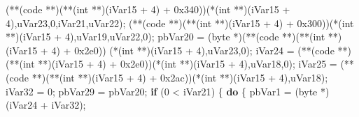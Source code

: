 \documentclass[
]{article}
\newenvironment{Shaded}{}{}
\newcommand{\BaseNTok}[1]{\textcolor[rgb]{0.25,0.63,0.44}{#1}}
\newcommand{\ControlFlowTok}[1]{\textcolor[rgb]{0.00,0.44,0.13}{\textbf{#1}}}
\newcommand{\DataTypeTok}[1]{\textcolor[rgb]{0.56,0.13,0.00}{#1}}
\newcommand{\DecValTok}[1]{\textcolor[rgb]{0.25,0.63,0.44}{#1}}
\newcommand{\NormalTok}[1]{#1}
\newcommand{\OperatorTok}[1]{\textcolor[rgb]{0.40,0.40,0.40}{#1}}
\begin{document}
\begin{Shaded}
\begin{Highlighting}[]
      \OperatorTok{(**(}\NormalTok{code }\OperatorTok{**)(**(}\DataTypeTok{int} \OperatorTok{**)(}\NormalTok{iVar15 }\OperatorTok{+} \DecValTok{4}\OperatorTok{)} \OperatorTok{+} \BaseNTok{0x340}\OperatorTok{))(*(}\DataTypeTok{int} \OperatorTok{**)(}\NormalTok{iVar15 }\OperatorTok{+} \DecValTok{4}\OperatorTok{),}\NormalTok{uVar23}\OperatorTok{,}\DecValTok{0}\OperatorTok{,}\NormalTok{iVar21}\OperatorTok{,}\NormalTok{uVar22}\OperatorTok{);}
      \OperatorTok{(**(}\NormalTok{code }\OperatorTok{**)(**(}\DataTypeTok{int} \OperatorTok{**)(}\NormalTok{iVar15 }\OperatorTok{+} \DecValTok{4}\OperatorTok{)} \OperatorTok{+} \BaseNTok{0x300}\OperatorTok{))(*(}\DataTypeTok{int} \OperatorTok{**)(}\NormalTok{iVar15 }\OperatorTok{+} \DecValTok{4}\OperatorTok{),}\NormalTok{uVar19}\OperatorTok{,}\NormalTok{uVar22}\OperatorTok{,}\DecValTok{0}\OperatorTok{);}
\NormalTok{      pbVar20 }\OperatorTok{=} \OperatorTok{(}\NormalTok{byte }\OperatorTok{*)(**(}\NormalTok{code }\OperatorTok{**)(**(}\DataTypeTok{int} \OperatorTok{**)(}\NormalTok{iVar15 }\OperatorTok{+} \DecValTok{4}\OperatorTok{)} \OperatorTok{+} \BaseNTok{0x2e0}\OperatorTok{))}
                                  \OperatorTok{(*(}\DataTypeTok{int} \OperatorTok{**)(}\NormalTok{iVar15 }\OperatorTok{+} \DecValTok{4}\OperatorTok{),}\NormalTok{uVar23}\OperatorTok{,}\DecValTok{0}\OperatorTok{);}
\NormalTok{      iVar24 }\OperatorTok{=} \OperatorTok{(**(}\NormalTok{code }\OperatorTok{**)(**(}\DataTypeTok{int} \OperatorTok{**)(}\NormalTok{iVar15 }\OperatorTok{+} \DecValTok{4}\OperatorTok{)} \OperatorTok{+} \BaseNTok{0x2e0}\OperatorTok{))(*(}\DataTypeTok{int} \OperatorTok{**)(}\NormalTok{iVar15 }\OperatorTok{+} \DecValTok{4}\OperatorTok{),}\NormalTok{uVar18}\OperatorTok{,}\DecValTok{0}\OperatorTok{);}
\NormalTok{      iVar25 }\OperatorTok{=} \OperatorTok{(**(}\NormalTok{code }\OperatorTok{**)(**(}\DataTypeTok{int} \OperatorTok{**)(}\NormalTok{iVar15 }\OperatorTok{+} \DecValTok{4}\OperatorTok{)} \OperatorTok{+} \BaseNTok{0x2ac}\OperatorTok{))(*(}\DataTypeTok{int} \OperatorTok{**)(}\NormalTok{iVar15 }\OperatorTok{+} \DecValTok{4}\OperatorTok{),}\NormalTok{uVar18}\OperatorTok{);}
\NormalTok{      iVar32 }\OperatorTok{=} \DecValTok{0}\OperatorTok{;}
\NormalTok{      pbVar29 }\OperatorTok{=}\NormalTok{ pbVar20}\OperatorTok{;}
      \ControlFlowTok{if} \OperatorTok{(}\DecValTok{0} \OperatorTok{\textless{}}\NormalTok{ iVar21}\OperatorTok{)} \OperatorTok{\{}
        \ControlFlowTok{do} \OperatorTok{\{}
\NormalTok{          pbVar1 }\OperatorTok{=} \OperatorTok{(}\NormalTok{byte }\OperatorTok{*)(}\NormalTok{iVar24 }\OperatorTok{+}\NormalTok{ iVar32}\OperatorTok{);}

\end{Highlighting}
\end{Shaded}
\end{document}
